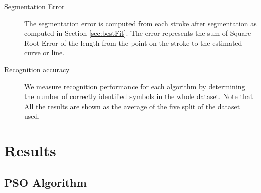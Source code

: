\begin{description}
	\item[Segmentation Error] The segmentation error is computed from each stroke after segmentation as computed in Section \ref{sec:bestFit}. The error represents the sum of Square Root Error of the length from the point on the stroke to the estimated curve or line. 
	  
	\item [Recognition accuracy] We measure recognition performance for each algorithm by determining the number of correctly identified symbols in the whole dataset. Note that All the results are shown as the average of the five split of the dataset used. 
\end{description}

 

\section{Results}
\label{sec:ResultsDetails}

\subsection{PSO Algorithm}
\label{sec:PSO}



   
% 
% 

